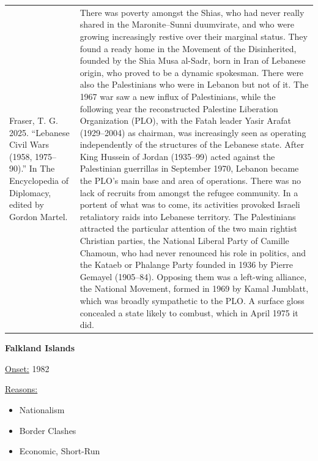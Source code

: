 {\begin{longtable}{p{}p{}}
Fraser, T. G. 2025. “Lebanese Civil Wars (1958, 1975–90).” In The Encyclopedia of Diplomacy, edited by Gordon Martel. & There was poverty amongst the Shias, who had never really shared in the Maronite–Sunni duumvirate, and who were growing increasingly restive over their marginal status. They found a ready home in the Movement of the Disinherited, founded by the Shia Musa al-Sadr, born in Iran of Lebanese origin, who proved to be a dynamic spokesman. There were also the Palestinians who were in Lebanon but not of it. The 1967 war saw a new influx of Palestinians, while the following year the reconstructed Palestine Liberation Organization (PLO), with the Fatah leader Yasir Arafat (1929–2004) as chairman, was increasingly seen as operating independently of the structures of the Lebanese state. After King Hussein of Jordan (1935–99) acted against the Palestinian guerrillas in September 1970, Lebanon became the PLO's main base and area of operations. There was no lack of recruits from amongst the refugee community. In a portent of what was to come, its activities provoked Israeli retaliatory raids into Lebanese territory. The Palestinians attracted the particular attention of the two main rightist Christian parties, the National Liberal Party of Camille Chamoun, who had never renounced his role in politics, and the Kataeb or Phalange Party founded in 1936 by Pierre Gemayel (1905–84). Opposing them was a left-wing alliance, the National Movement, formed in 1969 by Kamal Jumblatt, which was broadly sympathetic to the PLO. A surface gloss concealed a state likely to combust, which in April 1975 it did.
\\
\end{longtable}}
\clearpage
         \textbf{Falkland Islands} 

          \underline{Onset:} 1982         

\underline{Reasons:}
\begin{itemize}
\item Nationalism
\item Border Clashes
\item Economic, Short-Run
\end{itemize}

